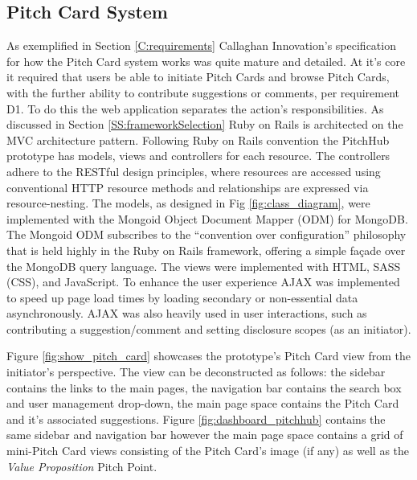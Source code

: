 \subsection{Pitch Card System}
As exemplified in Section \ref{C:requirements} Callaghan Innovation's specification for how the Pitch Card system works was quite mature and detailed. At it's core it required that users be able to initiate Pitch Cards and browse Pitch Cards, with the further ability to contribute suggestions or comments, per requirement D1. To do this the web application separates the action's responsibilities. As discussed in Section \ref{SS:frameworkSelection} Ruby on Rails is architected on the MVC architecture pattern. Following Ruby on Rails convention the PitchHub prototype has models, views and controllers for each resource. The controllers adhere to the RESTful design principles, where resources are accessed using conventional HTTP resource methods and relationships are expressed via resource-nesting. The models, as designed in Fig \ref{fig:class_diagram}, were implemented with the Mongoid \cite{Mongo4:online} Object Document Mapper (ODM) for MongoDB. The Mongoid ODM subscribes to the ``convention over configuration'' philosophy that is held highly in the Ruby on Rails framework, offering a simple fa\c{c}ade over the MongoDB query language. The views were implemented with HTML, SASS (CSS), and JavaScript. To enhance the user experience AJAX was implemented to speed up page load times by loading secondary or non-essential data asynchronously. AJAX was also heavily used in user interactions, such as contributing a suggestion/comment and setting disclosure scopes (as an initiator).
\par
Figure \ref{fig:show_pitch_card} showcases the prototype's Pitch Card view from the initiator's perspective. The view can be deconstructed as follows: the sidebar contains the links to the main pages, the navigation bar contains the search box and user management drop-down, the main page space contains the Pitch Card and it's associated suggestions. Figure \ref{fig:dashboard_pitchhub} contains the same sidebar and navigation bar however the main page space contains a grid of mini-Pitch Card views consisting of the Pitch Card's image (if any) as well as the \textit{Value Proposition} Pitch Point.

